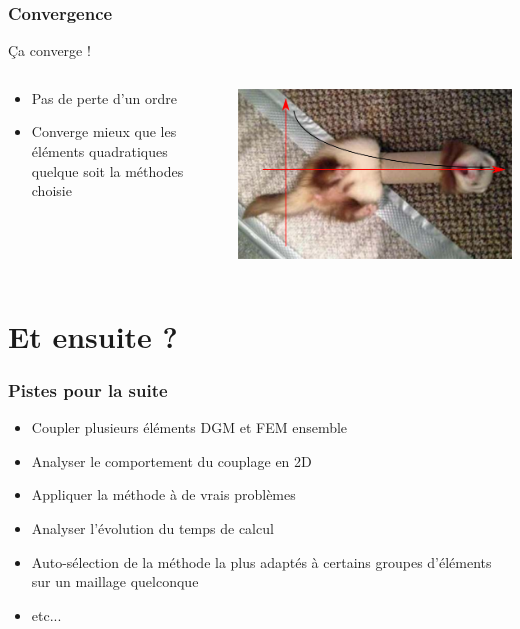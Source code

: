\documentclass[10pt, compress]{beamer}
\begin{document}
\begin{frame}
	\frametitle{Convergence}

	\begin{block}{Ça converge !}
		\begin{columns}[onlytextwidth]
		\begin{column}{0.6\textwidth}
				\begin{itemize}
				  \item Pas de perte d'un ordre
				  \item Converge mieux que les éléments quadratiques quelque soit la méthodes choisie
				\end{itemize}
		\end{column}
		\pause
		\begin{column}{0.4\textwidth}\centering
			\includegraphics[width=\textwidth]{ferret_converges_mod.png}
		\end{column}
		\end{columns}
	\end{block}
\end{frame}

\section{Et ensuite ?}

\begin{frame}
	\frametitle{Pistes pour la suite}

	\begin{itemize}
		\item Coupler plusieurs éléments DGM et FEM ensemble
		\item Analyser le comportement du couplage en 2D
		\item Appliquer la méthode à de vrais problèmes
		\item Analyser l'évolution du temps de calcul
		\item Auto-sélection de la méthode la plus adaptés à certains groupes d'éléments sur un maillage quelconque
		\item etc...
	\end{itemize}
\end{frame}
\end{document}
